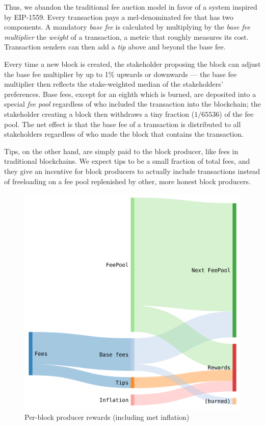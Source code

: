 \documentclass[headinclude]{scrbook}
\begin{document}
Thus, we abandon the traditional fee auction model in favor of a system inspired by EIP-1559. Every transaction pays a mel-denominated fee that has two components. A mandatory \textit{base fee} is calculated by multiplying by the \textit{base fee multiplier} the \textit{weight} of a transaction, a metric that roughly measures its cost. Transaction senders can then add a \textit{tip} above and beyond the base fee.

Every time a new block is created, the stakeholder proposing the block can adjust the base fee multiplier by up to 1\% upwards or downwards --- the base fee multiplier then reflects the stake-weighted median of the stakeholders' preferences. Base fees, except for an eighth which is burned, are deposited into a special \textit{fee pool} regardless of who included the transaction into the blockchain; the stakeholder creating a block then withdraws a tiny fraction ($1/65536$) of the fee pool. The net effect is that the base fee of a transaction is distributed to all stakeholders regardless of who made the block that contains the transaction.

Tips, on the other hand, are simply paid to the block producer, like fees in traditional blockchains. We expect tips to be a small fraction of total fees, and they give an incentive for block producers to actually include transactions instead of freeloading on a fee pool replenished by other, more honest block producers.

\begin{figure}
    \centering \includegraphics[width=0.7\linewidth]{fees.png}
    \caption{Per-block producer rewards (including met inflation)}
    \label{fig:fees}
\end{figure}
\end{document}

